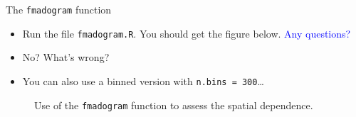 \documentclass[blackslide,style=simple]{powerdot}
\theoremstyle{plain}%
\theoremstyle{definition}
\theoremstyle{remark}
\newcommand{\advice}[1]{\HandPencilLeft{} \emph{#1}}
\begin{document}
\begin{wideslide}[toc=]{The \texttt{fmadogram} function}
  \vspace{-1.5em}
  \begin{itemize}
  \item Run the file \texttt{fmadogram.R}. You should get the figure
    below. \textcolor{blue}{Any questions?}
  \item<2-> No? What's wrong?
  \item<3-> You can also use a binned version with \texttt{n.bins =
      300}\ldots
  \end{itemize}
  \begin{figure}
    \centering
    \caption{Use of the \texttt{fmadogram} function to assess the spatial dependence.}
    \label{fig:fmadogram}
  \end{figure}
\end{wideslide}
\end{document}
